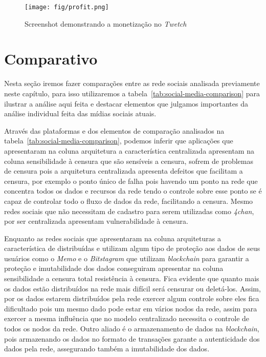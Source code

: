 \begin{figure}[H]
    \centering
    \texttt{[image: fig/profit.png]}
    \caption[Monetização no Twetch]{\label{fig:twetch-profit}
        Screenshot demonstrando a monetização no \textit{Twetch}~\cite{Twetch1}
    }
\end{figure}

\section{Comparativo}

Nesta seção iremos fazer comparações entre as rede sociais analisada previamente neste capítulo, para isso utilizaremos a tabela~\ref{tab:social-media-comparison} para ilustrar a análise aqui feita e destacar elementos que julgamos importantes da análise individual feita das mídias sociais atuais.

Através das plataformas e dos elementos de comparação analisados na tabela~\ref{tab:social-media-comparison}, podemos inferir que aplicações que apresentaram na coluna arquitetura a característica centralizada  apresentam na coluna sensibilidade à censura que são sensíveis a  censura, sofrem de problemas de censura pois a arquitetura centralizada apresenta defeitos que facilitam a censura, por exemplo o ponto único de falha pois havendo um ponto na rede que concentra todos os dados e recursos da rede tendo o controle sobre esse ponto se é capaz de controlar todo o fluxo de dados da rede, facilitando a censura. Mesmo redes sociais que não necessitam de cadastro para serem utilizadas como \textit{4chan}, por ser centralizada apresentam vulnerabilidade à censura.

Enquanto as redes sociais que apresentaram na coluna arquiteturas a característica de  distribuídas e utilizam algum tipo de proteção aos dados de seus usuários como o \textit{Memo} e o \textit{Bitstagram} que utilizam \textit{blockchain} para garantir a proteção e imutabilidade dos dados conseguiram apresentar na coluna sensibilidade a censura total resistência à censura. Fica evidente que quanto mais os dados estão distribuídos na rede mais difícil será  censurar ou deletá-los. Assim, por os dados estarem distribuídos pela rede exercer algum controle sobre eles fica dificultado pois um mesmo dado pode estar em vários nodos da rede, assim para exercer a mesma influência que no modelo centralizado necessita o controle de todos os nodos da rede. Outro aliado é o armazenamento de dados na \textit{blockchain}, pois armazenando os dados no formato de transações garante a autenticidade dos dados pela rede, assegurando também a imutabilidade dos dados.

